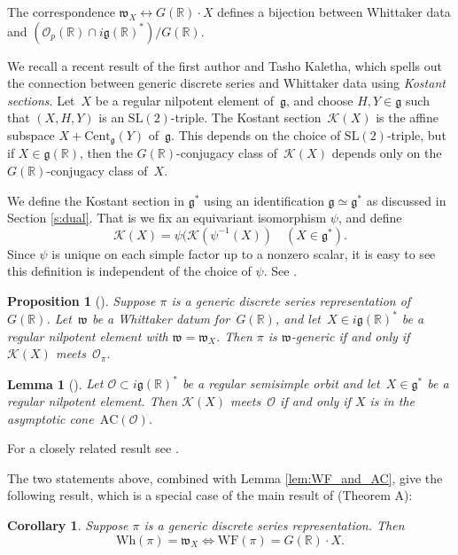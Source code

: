 \documentclass[cupthm]{CUP-JNL-JMJ}
\numberwithin{equation}{section}
\theoremstyle{cupplain}
\newtheorem{proposition}{Proposition}[section]
\newtheorem{lemma}[theorem]{Lemma}
\newtheorem{corollary}[theorem]{Corollary}
\theoremstyle{cupdefinition}
\theoremstyle{cupremark}
\theoremstyle{cupproof}
\renewcommand{\O}{\mathcal O}
\newcommand{\R}{\mathbb R}
\newcommand{\K}{\mathcal K}
\newcommand{\g}{\mathfrak g}
\newcommand\inv{^{-1}}
\newcommand{\SL}{\text{SL}}
\newcommand{\w}{\mathfrak w}
\newcommand{\Wh}{\mathrm{Wh}}
\newcommand{\WF}{\mathrm{WF}}
\newcommand{\AC}{\mathrm{AC}}
\newcommand{\Op}{\O_p}
\newcommand{\Kostant}[1]{\mathcal{K}(#1)}
\begin{document}
The correspondence $\mathfrak{w}_{X} \leftrightarrow G(\R)\cdot X$ defines a bijection between Whittaker data and
$(\Op(\R)\cap i\g(\R)^*)/G(\R)$. 


We recall a recent result of the first author and Tasho Kaletha, which spells out the connection between generic discrete series and Whittaker data using  {\it Kostant sections}. Let~$X$ be a regular nilpotent element of~$\g$, and choose  $H, Y \in \g$ such that $(X,H,Y)$ is an  $\SL(2)$-triple. The Kostant section~$\Kostant{X}$ is the affine subspace $X + \mathrm{Cent}_{\g}(Y)$ of~$\g$. This depends on the choice of $\SL(2)$-triple, but if $X \in \g(\R)$, then the $G(\R)$-conjugacy class of~$\Kostant{X}$ depends only on the $G(\R)$-conjugacy class of~$X$.

We define the Kostant section in $\g^*$ using an identification $\g\simeq \g^*$ as discussed in Section \ref{s:dual}. That is we fix an equivariant isomorphism $\psi$, and define
$$
\K(X)=\psi(\K(\psi\inv(X))\quad (X\in \g^*).
$$
Since $\psi$ is unique on each simple factor up to a nonzero scalar, it is easy to see this definition is independent of the choice of $\psi$. See \cite[Section 3.2]{adams_kaletha}.

\begin{proposition}[]\label{JeffTasho_criterion}
  \label{p:Kostant}
Suppose $\pi$ is a generic discrete series representation of~$G(\R)$. Let~$\w$ be a Whittaker datum for~$G(\R)$, and let~$X \in i\g(\R)^*$ be a regular nilpotent element with $\w = \w_X$. 
Then $\pi$ is $\w$-generic if and only if $\Kostant{X}$ meets~$\mathcal{O}_\pi$. 
\end{proposition}



\begin{lemma}[]
\label{lem:Kost_and_AC}
Let $\mathcal{O} \subset i\g(\R)^\ast$ be a regular semisimple orbit and  let~$X \in \g^\ast$ be a regular nilpotent element. Then $\Kostant{X}$ meets~$\mathcal{O}$ if and only if $X$ is in the asymptotic cone~$\AC(\mathcal{O})$. 
\end{lemma}

For a closely related result see \cite[Proposition 3.5]{fm}.
\medskip

The two statements above, combined with Lemma \ref{lem:WF_and_AC}, give the following result,
which is a special case of the main result of \cite{matumoto} (Theorem A):
\begin{corollary}\label{cor:matumoto}
Suppose $\pi$ is a generic discrete series representation. Then
$$
\Wh(\pi)=\w_X\Leftrightarrow \WF(\pi)=G(\R)\cdot X.
$$
\end{corollary}
\end{document}
